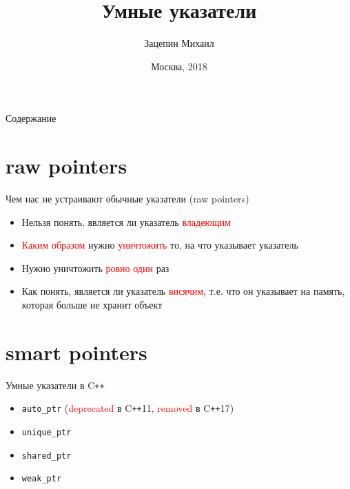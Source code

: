 \documentclass[10pt]{beamer}
\title[\href{https://goo.gl/NRgp8K}{https://goo.gl/NRgp8K} (Term 3)]{Умные указатели}
\author[Зацепин Михаил]{Зацепин Михаил}
\institute[МФТИ] 
{Московский физико-технический институт\\*}
\date{Москва, 2018}
\begin{document}
\begin{frame}
  \titlepage
\end{frame}

\begin{frame}{Содержание}
\begin{multicols}{2}
\tableofcontents
\end{multicols}
\end{frame}

\section{raw pointers}
\begin{frame}{Чем нас не устраивают обычные указатели (raw pointers)}
\begin{itemize}
\item{Нельзя понять, является ли указатель \textcolor{red}{владеющим}}
\item{\textcolor{red}{Каким образом} нужно  \textcolor{red}{уничтожить} то, на что указывает указатель}
\item{Нужно уничтожить \textcolor{red}{ровно один} раз}
\item{Как понять, является ли указатель \textcolor{red}{висячим}, т.е. что он указывает на память, которая больше не хранит объект}
\end{itemize}
\end{frame}

\section{smart pointers}
\begin{frame}{Умные указатели в C\texttt{++}}
\begin{itemize}
\item{\texttt{auto\_ptr} (\textcolor{red}{deprecated} в C\texttt{++}11, \textcolor{red}{removed} в C\texttt{++}17)}
\item{\texttt{unique\_ptr}}
\item{\texttt{shared\_ptr}}
\item{\texttt{weak\_ptr}}
\end{itemize}
\end{frame}
\end{document}
